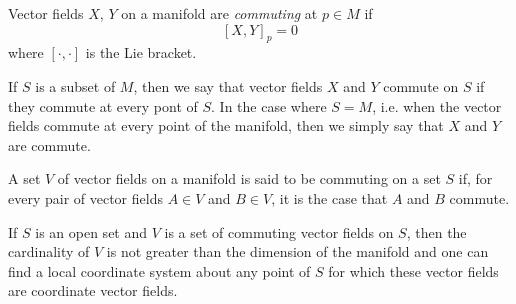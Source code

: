 \documentclass[12pt]{article}
\begin{document}
Vector fields $X$, $Y$ on a manifold are \emph{commuting}
at $p\in M$ if 
$$
  [X,Y]_p=0
$$
where $[\cdot,\cdot]$ is the Lie bracket.

If $S$ is a subset of $M$, then we say that vector fields $X$ and $Y$ commute on $S$ if they commute at every pont of $S$.  In the case where $S = M$, i.e. when the vector fields commute at every point of the manifold, then we simply say that $X$ and $Y$ are commute.

A set $V$ of vector fields on a manifold is said to be commuting on a set $S$ if, for every pair of vector fields $A \in V$ and $B \in V$, it is the case that $A$ and $B$ commute.

If $S$ is an open set and $V$ is a set of commuting vector fields on $S$, then the cardinality of $V$ is not greater than the dimension of the manifold and one can find a local coordinate system about any point of $S$ for which these vector fields are coordinate vector fields.
\end{document}
